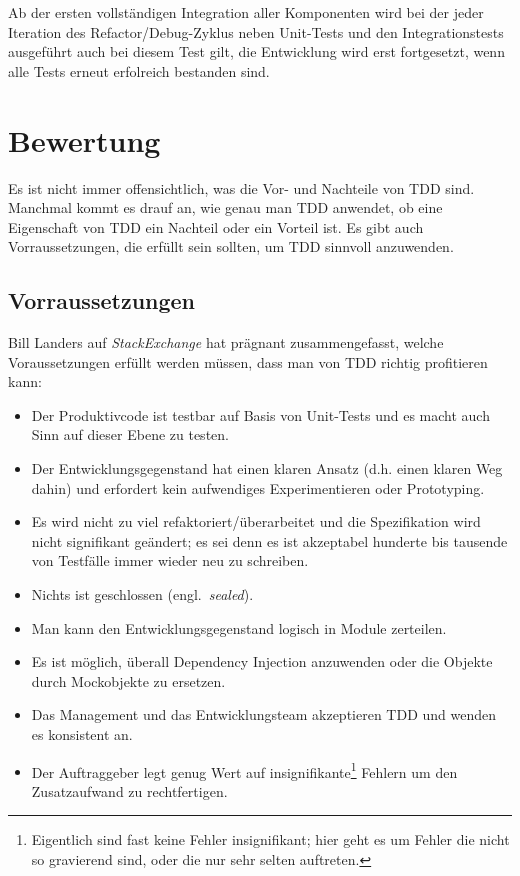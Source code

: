 \documentclass{mitschrift}
\newcommand{\pje}{\marginpar{Philipp\\Jeske}}
\newcommand{\bmn}{\marginpar{Benjamin\\Morgan}}
\begin{document}
Ab der ersten vollständigen Integration aller Komponenten wird bei der jeder
Iteration des Refactor/Debug-Zyklus neben Unit-Tests und den Integrationstests
ausgeführt auch bei diesem Test gilt, die Entwicklung wird erst fortgesetzt,
wenn alle Tests erneut erfolreich bestanden sind.


\chapter{Bewertung}\label{cpt:Bewertung}\bmn
Es ist nicht immer offensichtlich, was die Vor- und Nachteile von TDD sind. Manchmal
kommt es drauf an, wie genau man TDD anwendet, ob eine Eigenschaft von TDD
ein Nachteil oder ein Vorteil ist. Es gibt auch Vorraussetzungen, die erfüllt
sein sollten, um TDD sinnvoll anzuwenden.

\section{Vorraussetzungen}\label{sec:Vorraussetzungen}
Bill Landers auf \emph{StackExchange} \cite{StackExchange} hat prägnant
zusammengefasst, welche Voraussetzungen erfüllt werden müssen, dass man von TDD
richtig profitieren kann:

\begin{itemize}
    \item Der Produktivcode ist testbar auf Basis von Unit-Tests und es macht auch
        Sinn auf dieser Ebene zu testen.
    \item Der Entwicklungsgegenstand hat einen klaren Ansatz (d.h. einen klaren
        Weg dahin) und erfordert kein aufwendiges Experimentieren oder
        Prototyping.
    \item Es wird nicht zu viel refaktoriert/überarbeitet und die Spezifikation
        wird nicht signifikant geändert; es sei denn es ist akzeptabel hunderte
        bis tausende von Testfälle immer wieder neu zu schreiben.
    \item Nichts ist geschlossen (engl.\ \emph{sealed}).
    \item Man kann den Entwicklungsgegenstand logisch in Module zerteilen.
    \item Es ist möglich, überall Dependency Injection anzuwenden oder die
        Objekte durch Mockobjekte zu ersetzen.
    \item Das Management und das Entwicklungsteam akzeptieren TDD und wenden es
        konsistent an.
    \item Der Auftraggeber legt genug Wert auf insignifikante\footnote{Eigentlich
        sind fast keine Fehler insignifikant; hier geht es um Fehler die nicht
        so gravierend sind, oder die nur sehr selten auftreten.} Fehlern um den
        Zusatzaufwand zu rechtfertigen.
\end{itemize}
\end{document}
